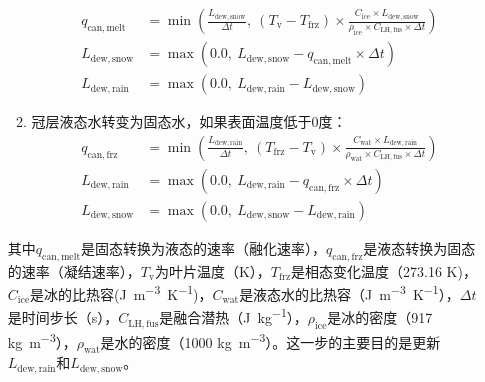 \begin{enumerate}
\begin{enumerate}
\begin{equation}
\begin{aligned}
            q_{\mathrm{can, melt}} &=\min \left(\frac{L_{\mathrm{dew,snow}}}{\Delta t},\ \left(T_{\mathrm{v}}-T_{\mathrm{frz}}\right) \times \frac{C_{\mathrm{ice}} \times L_{\mathrm{dew,snow}}}{\rho_{\mathrm{i c e}} \times C_{\mathrm{LH, fus}} \times \Delta t}\right) \\
            L_{\mathrm{dew,snow}} &=\max \left(0.0,\ L_{\mathrm{dew,snow}}-q_{\mathrm{c a n, m e l t}} \times \Delta t\right) \\
            L_{\mathrm{dew,rain}} &=\max \left(0.0,\ L_{\mathrm{dew,rain}}-L_{\mathrm{dew,snow}}\right)
          \end{aligned}
        \end{equation}
      \item 冠层液态水转变为固态水，如果表面温度低于0度：
        \begin{equation}
          \begin{aligned}
            q_{\mathrm{c a n, f r z}} &=\min \left(\frac{L_{\mathrm{dew,rain}}}{\Delta t},\ \left(T_{\mathrm{f r z}}-T_{\mathrm{v}}\right) \times \frac{C_{\mathrm{wat}} \times L_{\mathrm{dew,rain}}}{\rho_{\mathrm{wat}} \times C_{\mathrm{LH, fus}} \times \Delta t}\right) \\
            L_{\mathrm{dew,rain}} &=\max \left(0.0,\ L_{\mathrm{dew,rain}}-q_{\mathrm{can, frz}} \times \Delta t\right) \\
            L_{\mathrm{dew,snow}} &=\max \left(0.0,\ L_{\mathrm{dew,snow}}-L_{\mathrm{dew,rain}}\right)
          \end{aligned}
        \end{equation}
    \end {enumerate}
  其中$q_{\mathrm{can, melt}}$是固态转换为液态的速率（融化速率），$q_{\mathrm{can, frz}}$是液态转换为固态的速率（凝结速率），$T_{\mathrm{v}}$为叶片温度（K），$T_{\mathrm{frz}}$是相态变化温度（273.16 K)，$C_{\mathrm{ice}}$是冰的比热容(\unit{J.m^{-3}.K^{-1}})，$C_{\mathrm{wat}}$是液态水的比热容（\unit{J.m^{-3}.K^{-1}}），$\Delta t$是时间步长（s），$C_{\mathrm{LH, fus}}$是融合潜热（\unit{J.kg^{-1}}），$\rho_{\mathrm{ice}}$是冰的密度（917 \unit{kg.m^{-3}}），$\rho_{\mathrm{wat}}$是水的密度（1000 \unit{kg.m^{-3}}）。这一步的主要目的是更新$L_{\mathrm{dew,rain}}$和$L_{\mathrm{dew,snow}}$。


\end{enumerate}
